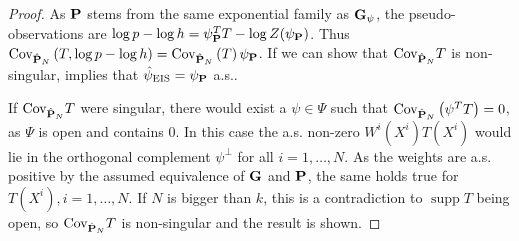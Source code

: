 \begin{proof}
   As $\P$ stems from the same exponential family as $\G_{\psi}$, the pseudo-observations are $\log p - \log h = \psi_{\P}^T T - \log Z(\psi_{\P})$. Thus $\cov_{\hat \P_{N}} \left( T, \log p - \log h \right) = \cov_{\hat \P_{N}} \left( T \right)\psi_{\P}$. 
   If we can show that $\cov_{\hat\P_{N}} T$ is non-singular,  implies that $\hpeis = \psi_{\P}$ a.s.. 

   If $\cov_{\hat \P_{N}} T$ were singular, there would exist a $\psi \in \Psi$ such that $\cov_{\hat \P_{N}} \left( \psi^{T}T \right) = 0$, as $\Psi$ is open and contains $0$. In this case the a.s. non-zero $W^{i}(X^{i}) T(X^{i})$ would lie in the orthogonal complement $\psi^{\perp}$ for all $i = 1, \dots, N$. As the weights are a.s. positive by the assumed equivalence of $\G$ and $\P$, the same holds true for $T(X^{i}), i = 1,\dots, N$.
   If $N$ is bigger than $k$, this is a contradiction to $\operatorname{supp} T $ being open, so $\cov_{\hat \P_{N}} T$ is non-singular and the result is shown.
    
\end{proof}

